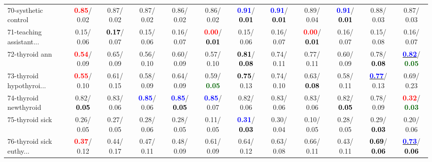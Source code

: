 \begin{table}[h]
\begin{center}
{\begin{tabular}{lc|c|c|c|c|c|c|c|c|c|c}
70-systhetic control & \textcolor{red}{\textbf{  0.85}}/  0.02 &   0.87/  0.02 &   0.87/  0.02 &   0.86/  0.02 &   0.86/  0.02 & \textcolor{blue}{\textbf{  0.91}}/\textcolor{black}{\textbf{  0.01}} & \textcolor{blue}{\textbf{  0.91}}/\textcolor{black}{\textbf{  0.01}} &   0.89/  0.04 & \textcolor{blue}{\textbf{  0.91}}/\textcolor{black}{\textbf{  0.01}} &   0.88/  0.03 &   0.87/  0.03 \\
71-teaching assistant... &   0.15/  0.06 & \textcolor{black}{\textbf{  0.17}}/  0.07 &   0.15/  0.06 &   0.16/  0.07 & \textcolor{red}{\textbf{  0.00}}/\textcolor{black}{\textbf{  0.01}} &   0.15/  0.06 &   0.16/  0.07 & \textcolor{red}{\textbf{  0.00}}/\textcolor{black}{\textbf{  0.01}} &   0.16/  0.07 &   0.15/  0.08 &   0.16/  0.07 \\ \hline
72-thyroid ann & \textcolor{red}{\textbf{  0.54}}/  0.09 &   0.65/  0.09 &   0.56/  0.10 &   0.60/  0.09 &   0.57/  0.10 & \textcolor{black}{\textbf{  0.81}}/\textcolor{black}{\textbf{  0.08}} &   0.74/  0.11 &   0.77/  0.11 &   0.60/  0.09 &   0.78/\textcolor{black}{\textbf{  0.08}} & \underline{\textcolor{blue}{\textbf{  0.82}}}/\textcolor{darkgreen}{\textbf{  0.05}} \\
73-thyroid hypothyroi... & \textcolor{red}{\textbf{  0.55}}/  0.10 &   0.61/  0.15 &   0.58/  0.09 &   0.64/  0.09 &   0.59/\textcolor{darkgreen}{\textbf{  0.05}} & \textcolor{black}{\textbf{  0.75}}/  0.13 &   0.74/  0.10 &   0.63/\textcolor{black}{\textbf{  0.08}} &   0.58/  0.11 & \underline{\textcolor{blue}{\textbf{  0.77}}}/  0.13 &   0.69/  0.23 \\
74-thyroid newthyroid &   0.82/\textcolor{black}{\textbf{  0.05}} &   0.83/  0.06 & \textcolor{blue}{\textbf{  0.85}}/  0.06 & \textcolor{blue}{\textbf{  0.85}}/\textcolor{black}{\textbf{  0.05}} & \textcolor{blue}{\textbf{  0.85}}/  0.07 &   0.82/  0.06 &   0.83/  0.06 &   0.83/  0.06 &   0.82/\textcolor{black}{\textbf{  0.05}} &   0.78/  0.09 & \textcolor{red}{\textbf{  0.32}}/\textcolor{darkgreen}{\textbf{  0.03}} \\
75-thyroid sick &   0.26/  0.05 &   0.27/  0.05 &   0.28/  0.06 &   0.28/  0.05 &   0.11/  0.05 & \textcolor{blue}{\textbf{  0.31}}/\textcolor{black}{\textbf{  0.03}} &   0.30/  0.04 &   0.10/  0.05 &   0.28/  0.05 &   0.29/\textcolor{black}{\textbf{  0.03}} &   0.20/  0.06 \\
76-thyroid sick euthy... & \textcolor{red}{\textbf{  0.37}}/  0.12 &   0.44/  0.17 &   0.47/  0.11 &   0.48/  0.09 &   0.61/  0.09 &   0.64/  0.12 &   0.63/  0.08 &   0.66/  0.11 &   0.43/  0.11 & \textcolor{black}{\textbf{  0.69}}/\textcolor{black}{\textbf{  0.06}} & \underline{\textcolor{blue}{\textbf{  0.73}}}/\textcolor{black}{\textbf{  0.06}} \\

\end{tabular}}
\end{center}
\end{table}
